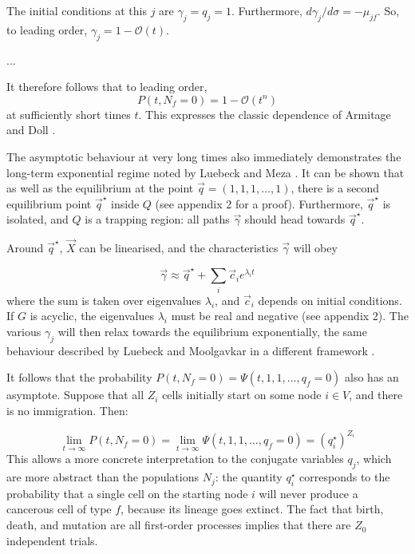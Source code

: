 \documentclass{article}
\begin{document}
The initial conditions at this $j$ are $\gamma_j = q_j = 1$. Furthermore, $d
\gamma_j / d\sigma = -\mu_{jf}$. So, to leading order, $\gamma_j = 1 -
\mathcal{O}(t)$.


...

It therefore follows that to leading order, 
\begin{equation}
    P(t, N_f = 0) = 1 - \mathcal{O}(t^n)
\end{equation}
at sufficiently short times $t$. This expresses the classic dependence of
Armitage and Doll \cite{armitage_doll}.

The asymptotic behaviour at very long times also immediately demonstrates the
long-term exponential regime noted by Luebeck and Meza \cite{meza2008age}.
It can be shown that as well as the equilibrium at the point $\vec{q} =
(1,1,1,\dots,1)$, there is a second equilibrium point $\vec{q}^\star$ inside $Q$ (see appendix 2
for a proof). Furthermore, $\vec{q}^\star$ is isolated, and $Q$ is a trapping region:
all paths $\vec{\gamma}$ should head towards $\vec{q}^\star$.

Around $\vec{q}^\star$, $\vec{X}$ can be linearised, and the characteristics
$\vec{\gamma}$ will obey

\begin{equation}
    \vec{\gamma} \approx \vec{q}^\star + \sum_i \vec{c}_i e^{\lambda_i t}
\end{equation}
where the sum is taken over eigenvalues $\lambda_i$, and $\vec{c}_i$ depends on
initial conditions. If $G$ is acyclic, the eigenvalues $\lambda_i$ must be real
and negative (see appendix 2). The various $\gamma_j$ will then relax towards
the equilibrium exponentially, the same behaviour described by Luebeck and
Moolgavkar in a different framework \cite{meza2008age}.

It follows that the probability $P(t,N_f = 0) = \Psi(t, 1,1,\dots,q_f = 0)$ also
has an asymptote. Suppose that all $Z_i$ cells initially start on some node $i \in
V$, and there is no immigration. Then:

\begin{equation}
    \lim_{t\rightarrow \infty} P(t, N_f = 0) = 
    \lim_{t\rightarrow \infty} \Psi(t,1,1,\dots,q_f=0) =
    \left(q^\star_i\right)^{Z_i}
\end{equation}
This allows a more concrete interpretation to the conjugate variables $q_j$,
which are more abstract than the populations $N_j$: the
quantity $q^\star_i$ corresponds to the probability that a single cell on the
starting node $i$ will never produce a cancerous cell of type $f$, because its lineage goes
extinct. The fact that birth, death, and mutation are all first-order processes
implies that there are $Z_0$ independent trials.
\end{document}

